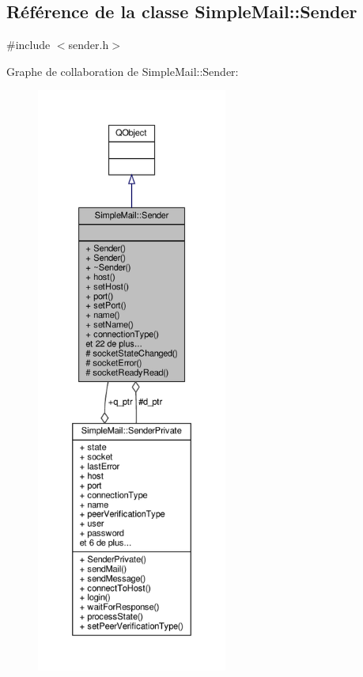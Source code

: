 \hypertarget{class_simple_mail_1_1_sender}{}\subsection{Référence de la classe Simple\+Mail\+:\+:Sender}
\label{class_simple_mail_1_1_sender}


{\ttfamily \#include $<$sender.\+h$>$}



Graphe de collaboration de Simple\+Mail\+:\+:Sender\+:\nopagebreak
\begin{figure}[H]
\begin{center}
\leavevmode
\includegraphics[height=550pt]{class_simple_mail_1_1_sender__coll__graph}
\end{center}
\end{figure}
